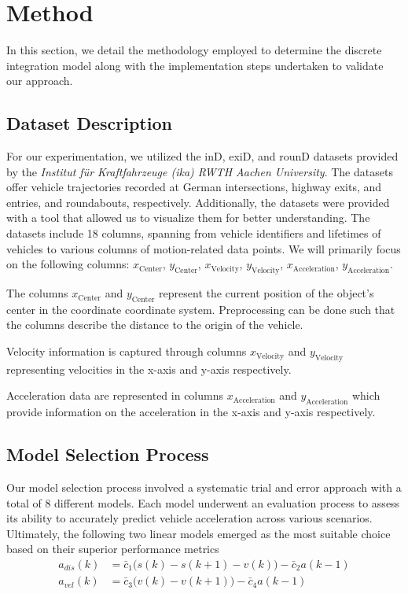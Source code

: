 \section{Method}

In this section, we detail the methodology employed to determine the discrete integration model
along with the implementation steps undertaken to validate our approach.

\subsection{Dataset Description} \label{sec:dataset_descrition}
For our experimentation, we utilized the inD, exiD, and rounD datasets provided by the 
\textit{Institut für Kraftfahrzeuge (ika) RWTH Aachen University}.
The datasets offer vehicle trajectories recorded at German intersections, highway exits, and entries, 
and roundabouts, respectively. 
Additionally, the datasets were provided with a tool that allowed us to visualize them for better understanding. 
The datasets include 18 columns, spanning from vehicle identifiers and lifetimes of vehicles to various columns of motion-related data points.
We will primarily focus on the following columns:
$x_{\text{Center}}$, $y_{\text{Center}}$, $x_{\text{Velocity}}$, $y_{\text{Velocity}}$, $x_{\text{Acceleration}}$, 
$y_{\text{Acceleration}}$.

The columns  $x_{\text{Center}}$ and $y_{\text{Center}}$ represent the current position of the object's center in the coordinate coordinate system. Preprocessing can be done such that the columns describe the distance to the origin of the vehicle.

Velocity information is captured through columns $x_{\text{Velocity}}$ and $y_{\text{Velocity}}$ representing velocities 
in the x-axis and y-axis respectively.

Acceleration data are represented in columns $x_{\text{Acceleration}}$ and $y_{\text{Acceleration}}$ which provide 
information on the acceleration in the x-axis and y-axis respectively.

\subsection{Model Selection Process} 
Our model selection process involved a systematic trial and error approach with a total of 8 different models. 
Each model underwent an evaluation process to assess its ability to accurately predict vehicle acceleration across 
various scenarios. 
Ultimately, the following two linear models emerged as the most suitable choice based on their superior performance metrics
\begin{align} 
    a_{dis}(k) &= \bar{c}_1 \bigl( s(k) - s(k+1) - v(k) \bigr) -\bar{c}_2 a(k-1) \\
    a_{vel}(k) &= \bar{c}_3 \bigl( v(k) - v(k+1) \bigr) -\bar{c}_4 a(k-1) 
\end{align}

